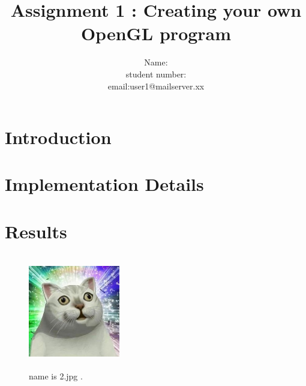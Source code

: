 \documentclass[acmtog]{acmart}
\title{Assignment 1 : Creating your own OpenGL program}
\author{Name:\quad 123213  \\ student number:\quad 123456789
	\\email:\quad user1@mailserver.xx}
\begin{document}
\maketitle

\vspace*{2 ex}


\section{Introduction}

\section{Implementation Details}

\section{Results}

\begin{figure}[h]
\centering
\includegraphics[width=4cm,height=5cm]{2.jpg}
\caption{name is 2.jpg .}
\end{figure}
\end{document}
